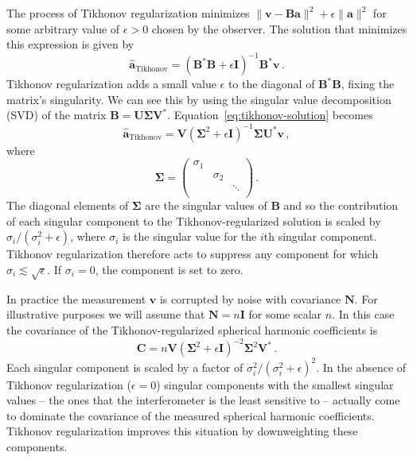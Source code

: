 \documentclass[twocolumn]{aastex6}
\renewcommand{\b}{\pmb}
\newcommand{\atikh}{\b{\hat a}_\text{Tikhonov}}
\begin{document}
The process of Tikhonov regularization minimizes $\|\b v - \b B\b a\|^2 + \epsilon\|\b a\|^2$ for
some arbitrary value of $\epsilon > 0$ chosen by the observer. The solution that minimizes this
expression is given by
\begin{equation}\label{eq:tikhonov-solution}
    \atikh = (\b B^*\b B + \epsilon\b I)^{-1}\b B^*\b v\,.
\end{equation}
Tikhonov regularization adds a small value $\epsilon$ to the diagonal of $\b B^*\b B$, fixing the
matrix's singularity. We can see this by using the singular value decomposition (SVD) of the matrix
$\b B = \b U \b \Sigma \b V^*$. Equation~\ref{eq:tikhonov-solution} becomes
\begin{equation}
    \atikh = \b V (\b\Sigma^2 + \epsilon \b I)^{-1}\b\Sigma \b U^*\b v\,,
\end{equation}
where
\[
    \b\Sigma = \left(
        \begin{array}{ccc}
            \sigma_1 & & \\
                     & \sigma_2 & \\
                     & & \ddots \\
        \end{array}
    \right)\,.
\]
The diagonal elements of $\b\Sigma$ are the singular values of $\b B$ and so the contribution of
each singular component to the Tikhonov-regularized solution is scaled by $\sigma_i / (\sigma_i^2 +
\epsilon)$, where $\sigma_i$ is the singular value for the $i$th singular component. Tikhonov
regularization therefore acts to suppress any component for which $\sigma_i\lesssim\sqrt{\epsilon}$.
If $\sigma_i = 0$, the component is set to zero.

In practice the measurement $\b v$ is corrupted by noise with covariance $\b N$. For illustrative
purposes we will assume that $\b N=n\b I$ for some scalar $n$. In this case the covariance of the
Tikhonov-regularized spherical harmonic coefficients is
\begin{equation}
    \b C = n \b V (\b\Sigma^2 + \epsilon\b I)^{-2} \b\Sigma^2 \b V^*\,.
\end{equation}
Each singular component is scaled by a factor of $\sigma_i^2/(\sigma_i^2 + \epsilon)^2$.
In the absence of Tikhonov regularization ($\epsilon=0$)
singular components with the smallest singular values -- the ones that the interferometer is
the least sensitive to -- actually come to dominate the covariance of the measured spherical
harmonic coefficients. Tikhonov regularization improves this situation by downweighting these
components.
\end{document}

